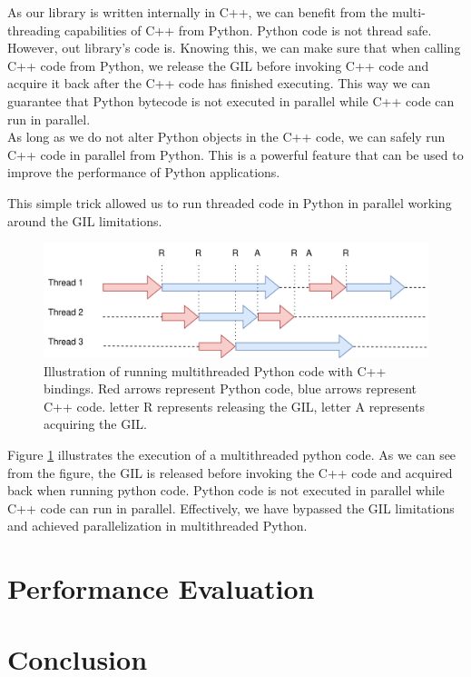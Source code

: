 \begin{spacing}{1.2}
    As our library is written internally in C++, we can benefit from the multi-threading capabilities
    of C++ from Python. Python code is not thread safe. However, out library's code is.
    Knowing this, we can make sure that when calling C++ code from Python, we release the GIL before 
    invoking C++ code and acquire it back after the C++ code has finished executing. This way we can 
    guarantee that Python bytecode is not executed in parallel while C++ code can run in parallel.\\

    As long as we do not alter Python objects in the C++ code, we can safely run C++ code in parallel
    from Python. This is a powerful feature that can be used to improve the performance of Python applications.

    This simple trick allowed us to run threaded code in Python in parallel working around the 
    GIL limitations.

    \begin{figure}
        \centering
        \includegraphics[width=\textwidth]{Chapitre4/figures/gil_c.png}
        \caption{Illustration of running multithreaded Python code with C++ bindings. Red arrows 
        represent Python code, blue arrows represent C++ code. letter R represents releasing the GIL,
        letter A represents acquiring the GIL.}
        \label{fig:python_parallelization}
    \end{figure}

    Figure \ref{fig:python_parallelization} illustrates the execution of a multithreaded python code.
    As we can see from the figure, the GIL is released before invoking the C++ code and acquired back
    when running python code. Python code is not executed in parallel while C++ code can run in parallel.
    Effectively, we have bypassed the GIL limitations and achieved parallelization in multithreaded Python.

    \section{Performance Evaluation}
    \section*{Conclusion}

\end{spacing}
